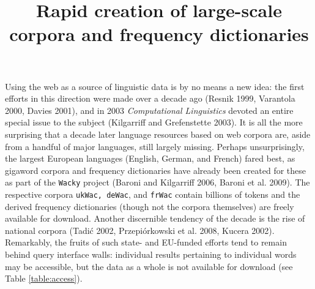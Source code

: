 \documentclass[10pt, a4paper]{article}
\begin{document}
\title{Rapid creation of large-scale corpora and frequency dictionaries}

\address{$^1$Computer and Automation Research Institute\\Hungarian Academy of Sciences\\{\tt\{recski,zseder,kornai\}@sztaki.hu}\\
$^2$Media Education and Research Center\\Budapest University of Technology and Economics\\{\tt daniel@mokk.bme.hu}
}





\maketitleabstract

Using the web as a source of linguistic data is by no means a new idea: the
first efforts in this direction were made over a decade ago (Resnik 1999,
Varantola 2000, Davies 2001)\nocite{Resnik:1999}, and in 2003 {\it
  Computational Linguistics} devoted an entire special issue to the subject
(Kilgarriff and Grefenstette 2003).\nocite{Kilgarriff:2003} It is all the more
surprising that a decade later language resources based on web corpora are,
aside from a handful of major languages, still largely missing. Perhaps
unsurprisingly, the largest European languages (English, German, and French)
fared best, as gigaword corpora and frequency dictionaries have already been
created for these as part of the \texttt{Wacky} project (Baroni and Kilgarriff
2006, Baroni et al. 2009)\nocite{baroni2009wacky}\nocite{baroni2006large}. The
respective corpora \texttt{ukWac, deWac}, and \texttt{frWac} contain billions
of tokens and the derived frequency dictionaries (though not the corpora
themselves) are freely available for download. Another discernible tendency of
the decade is the rise of national corpora (Tadi\'c
2002,\nocite{tadic2002building} Przepi{\'o}rkowski et
al. 2008,\nocite{przepiorkowski2008towards} Kucera
2002).\nocite{kucera2002czech} Remarkably, the fruits of such state- and
EU-funded efforts tend to remain behind query interface walls: individual
results pertaining to individual words may be accessible, but the data as a
whole is not available for download (see Table \ref{table:access}).
\end{document}
